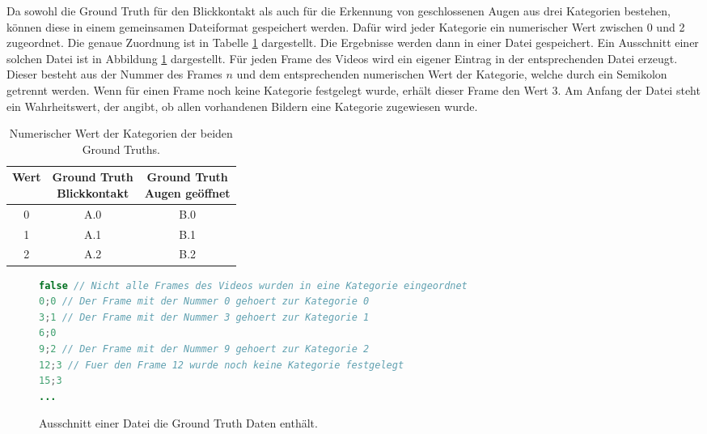 Da sowohl die Ground Truth für den Blickkontakt als auch für die Erkennung von geschlossenen Augen aus drei Kategorien bestehen, können diese in einem gemeinsamen Dateiformat gespeichert werden. Dafür wird jeder Kategorie ein numerischer Wert zwischen 0 und 2 zugeordnet. Die genaue Zuordnung ist in Tabelle \ref{tab:evaluation:labels:numeric:values} dargestellt. Die Ergebnisse werden dann in einer Datei gespeichert. Ein Ausschnitt einer solchen Datei ist in Abbildung \ref{code:evaluation:labels:output} dargestellt. Für jeden Frame des Videos wird ein eigener Eintrag in der entsprechenden Datei erzeugt. Dieser besteht aus der Nummer des Frames $n$ und dem entsprechenden numerischen Wert der Kategorie, welche durch ein Semikolon getrennt werden. Wenn für einen Frame noch keine Kategorie festgelegt wurde, erhält dieser Frame den Wert 3. Am Anfang der Datei steht ein Wahrheitswert, der angibt, ob allen vorhandenen Bildern eine Kategorie zugewiesen wurde.

\begin{table}[]
    \centering
    \begin{tabular}{c c c}
    \toprule
         \textbf{Wert} & \makecell{\textbf{Ground Truth}\\\textbf{Blickkontakt}} & \makecell{\textbf{Ground Truth}\\\textbf{Augen geöffnet}} \\ \midrule
         0 & A.0 & B.0 \\
         1 & A.1 & B.1 \\
         2 & A.2 & B.2 \\
         \bottomrule
    \end{tabular}
    \caption{Numerischer Wert der Kategorien der beiden Ground Truths.}
    \label{tab:evaluation:labels:numeric:values}
\end{table}

\begin{figure}
    \centering
   \begin{lstlisting}[language=Java]
false // Nicht alle Frames des Videos wurden in eine Kategorie eingeordnet
0;0 // Der Frame mit der Nummer 0 gehoert zur Kategorie 0
3;1 // Der Frame mit der Nummer 3 gehoert zur Kategorie 1
6;0
9;2 // Der Frame mit der Nummer 9 gehoert zur Kategorie 2
12;3 // Fuer den Frame 12 wurde noch keine Kategorie festgelegt
15;3 
...
\end{lstlisting}
    \caption{Ausschnitt einer Datei die Ground Truth Daten enthält.}
    \label{code:evaluation:labels:output}
\end{figure}


